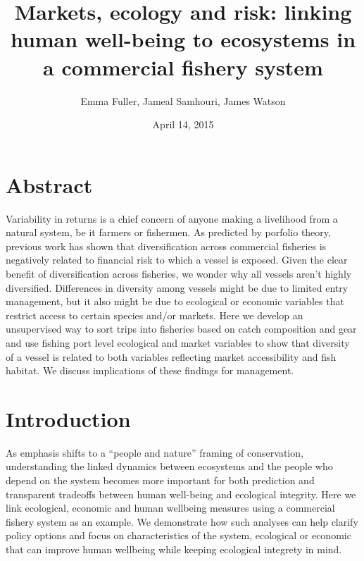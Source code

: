 \documentclass[]{article}
\title{Markets, ecology and risk: linking human well-being to ecosystems in a
commercial fishery system}
\author{Emma Fuller, Jameal Samhouri, James Watson}
\date{April 14, 2015}
\begin{document}
\maketitle


\section{Abstract}\label{abstract}

Variability in returns is a chief concern of anyone making a livelihood
from a natural system, be it farmers or fishermen. As predicted by
porfolio theory, previous work has shown that diversification across
commercial fisheries is negatively related to financial risk to which a
vessel is exposed. Given the clear benefit of diversification across
fisheries, we wonder why all vessels aren't highly diversified.
Differences in diversity among vessels might be due to limited entry
management, but it also might be due to ecological or economic variables
that restrict access to certain species and/or markets. Here we develop
an unsupervised way to sort trips into fisheries based on catch
composition and gear and use fishing port level ecological and market
variables to show that diversity of a vessel is related to both
variables reflecting market accessibility and fish habitat. We discuss
implications of these findings for management.

\section{Introduction}\label{introduction}

As emphasis shifts to a ``people and nature'' framing of conservation,
understanding the linked dynamics between ecosystems and the people who
depend on the system becomes more important for both prediction and
transparent tradeoffs between human well-being and ecological integrity.
Here we link ecological, economic and human wellbeing measures using a
commercial fishery system as an example. We demonstrate how such
analyses can help clarify policy options and focus on characteristics of
the system, ecological or economic that can improve human wellbeing
while keeping ecological integrety in mind.
\end{document}

